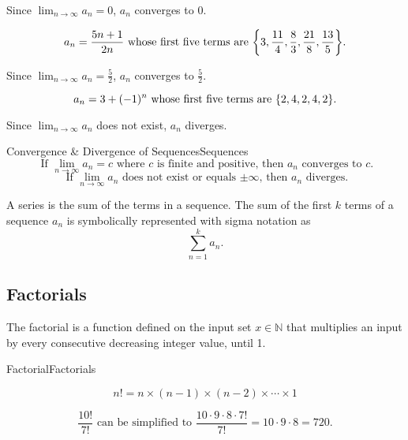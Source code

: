 \documentclass{article}
\theoremstyle{definition}
\DeclarePairedDelimiter{\curly}{\{}{\}}
\begin{document}
\begin{center}
    Since $\displaystyle\lim_{n \to \infty} a_n = 0$, $a_n$ converges to 0.
\end{center}

\[a_n  = \frac{5n+1}{2n} \text{ whose first five terms are } \curly*{3, \frac{11}{4}, \frac{8}{3}, \frac{21}{8}, \frac{13}{5}}.\]

\begin{center}
    Since $\displaystyle\lim_{n \to \infty} a_n = \frac{5}{2}$, $a_n$ converges to $\frac{5}{2}$.
\end{center}

\[a_n  = 3+(-1)^n \text{ whose first five terms are } \curly*{2, 4, 2, 4, 2}.\]

\begin{center}
    Since $\displaystyle\lim_{n \to \infty} a_n$ does not exist, $a_n$ diverges.
\end{center}

\vspace{0.5cm}

\begin{definition}{Convergence \& Divergence of Sequences}{Sequences}
\vspace{-0.5cm}
    \[ \text{ If } \lim_{n \to \infty} a_n = c \text{ where } c \text{ is finite and positive, then } a_n \text{ converges to } c. \]
    \vspace{-0.5cm}
    \[ \text{ If } \lim_{n \to \infty} a_n \text{ does not exist or equals $\pm \infty$, then } a_n \text{ diverges.}\]
\end{definition}

A series is the sum of the terms in a sequence. The sum of the first $k$ terms of a sequence $a_n$ is symbolically represented with sigma notation as \[\sum_{n=1}^{k} a_n.\]

\subsection{Factorials}

The factorial is a function defined on the input set $x \in \mathbb{N}$ that multiplies an input by every consecutive decreasing integer value, until 1.

\begin{definition}{Factorial}{Factorials}

\[n!=n\times(n-1)\times(n-2)\times \cdots \times 1\]
\end{definition}

\[\frac{10!}{7!} \text{ can be simplified to } \frac{10 \cdot 9 \cdot 8 \cdot 7!}{7!}=10\cdot9\cdot8=720.\]
\end{document}
